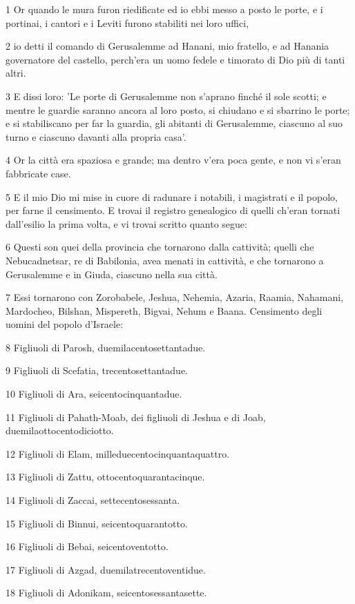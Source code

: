 \par 1 Or quando le mura furon riedificate ed io ebbi messo a posto le porte, e i portinai, i cantori e i Leviti furono stabiliti nei loro uffici,
\par 2 io detti il comando di Gerusalemme ad Hanani, mio fratello, e ad Hanania governatore del castello, perch'era un uomo fedele e timorato di Dio più di tanti altri.
\par 3 E dissi loro: 'Le porte di Gerusalemme non s'aprano finché il sole scotti; e mentre le guardie saranno ancora al loro posto, si chiudano e si sbarrino le porte; e si stabiliscano per far la guardia, gli abitanti di Gerusalemme, ciascuno al suo turno e ciascuno davanti alla propria casa'.
\par 4 Or la città era spaziosa e grande; ma dentro v'era poca gente, e non vi s'eran fabbricate case.
\par 5 E il mio Dio mi mise in cuore di radunare i notabili, i magistrati e il popolo, per farne il censimento. E trovai il registro genealogico di quelli ch'eran tornati dall'esilio la prima volta, e vi trovai scritto quanto segue:
\par 6 Questi son quei della provincia che tornarono dalla cattività; quelli che Nebucadnetsar, re di Babilonia, avea menati in cattività, e che tornarono a Gerusalemme e in Giuda, ciascuno nella sua città.
\par 7 Essi tornarono con Zorobabele, Jeshua, Nehemia, Azaria, Raamia, Nahamani, Mardocheo, Bilshan, Mispereth, Bigvai, Nehum e Baana. Censimento degli uomini del popolo d'Israele:
\par 8 Figliuoli di Parosh, duemilacentosettantadue.
\par 9 Figliuoli di Scefatia, trecentosettantadue.
\par 10 Figliuoli di Ara, seicentocinquantadue.
\par 11 Figliuoli di Pahath-Moab, dei figliuoli di Jeshua e di Joab, duemilaottocentodiciotto.
\par 12 Figliuoli di Elam, milleduecentocinquantaquattro.
\par 13 Figliuoli di Zattu, ottocentoquarantacinque.
\par 14 Figliuoli di Zaccai, settecentosessanta.
\par 15 Figliuoli di Binnui, seicentoquarantotto.
\par 16 Figliuoli di Bebai, seicentoventotto.
\par 17 Figliuoli di Azgad, duemilatrecentoventidue.
\par 18 Figliuoli di Adonikam, seicentosessantasette.
